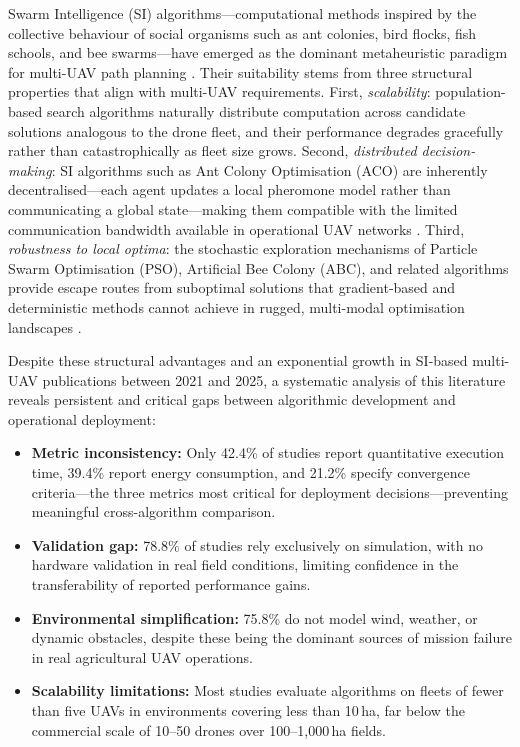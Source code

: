 \documentclass[review,3p,times]{elsarticle}
\begin{document}
Swarm Intelligence (SI) algorithms---computational methods inspired by the collective behaviour of social organisms such as ant colonies, bird flocks, fish schools, and bee swarms---have emerged as the dominant metaheuristic paradigm for multi-UAV path planning \cite{dorigo2006,kennedy1995,blum2008,yang2010,beni2005,bonabeau1999,yang2013}. Their suitability stems from three structural properties that align with multi-UAV requirements. First, \textit{scalability}: population-based search algorithms naturally distribute computation across candidate solutions analogous to the drone fleet, and their performance degrades gracefully rather than catastrophically as fleet size grows. Second, \textit{distributed decision-making}: SI algorithms such as Ant Colony Optimisation (ACO) are inherently decentralised---each agent updates a local pheromone model rather than communicating a global state---making them compatible with the limited communication bandwidth available in operational UAV networks \cite{dorigo2006,hayat2016}. Third, \textit{robustness to local optima}: the stochastic exploration mechanisms of Particle Swarm Optimisation (PSO), Artificial Bee Colony (ABC), and related algorithms provide escape routes from suboptimal solutions that gradient-based and deterministic methods cannot achieve in rugged, multi-modal optimisation landscapes \cite{kennedy1995,blum2008}.

Despite these structural advantages and an exponential growth in SI-based multi-UAV publications between 2021 and 2025, a systematic analysis of this literature reveals persistent and critical gaps between algorithmic development and operational deployment:

\begin{itemize}
  \item \textbf{Metric inconsistency:} Only 42.4\% of studies report quantitative execution time, 39.4\% report energy consumption, and 21.2\% specify convergence criteria---the three metrics most critical for deployment decisions---preventing meaningful cross-algorithm comparison.
  \item \textbf{Validation gap:} 78.8\% of studies rely exclusively on simulation, with no hardware validation in real field conditions, limiting confidence in the transferability of reported performance gains.
  \item \textbf{Environmental simplification:} 75.8\% do not model wind, weather, or dynamic obstacles, despite these being the dominant sources of mission failure in real agricultural UAV operations.
  \item \textbf{Scalability limitations:} Most studies evaluate algorithms on fleets of fewer than five UAVs in environments covering less than 10\,ha, far below the commercial scale of 10--50 drones over 100--1,000\,ha fields.
\end{itemize}
\end{document}
